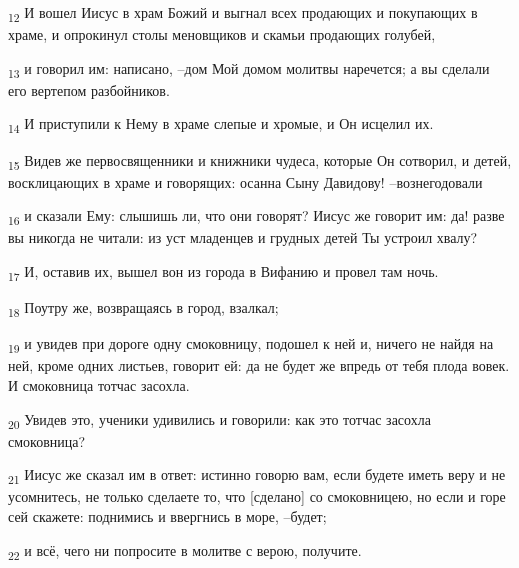 \begin{tcolorbox}
\textsubscript{12} И вошел Иисус в храм Божий и выгнал всех продающих и покупающих в храме, и опрокинул столы меновщиков и скамьи продающих голубей,
\end{tcolorbox}
\begin{tcolorbox}
\textsubscript{13} и говорил им: написано, --дом Мой домом молитвы наречется; а вы сделали его вертепом разбойников.
\end{tcolorbox}
\begin{tcolorbox}
\textsubscript{14} И приступили к Нему в храме слепые и хромые, и Он исцелил их.
\end{tcolorbox}
\begin{tcolorbox}
\textsubscript{15} Видев же первосвященники и книжники чудеса, которые Он сотворил, и детей, восклицающих в храме и говорящих: осанна Сыну Давидову! --вознегодовали
\end{tcolorbox}
\begin{tcolorbox}
\textsubscript{16} и сказали Ему: слышишь ли, что они говорят? Иисус же говорит им: да! разве вы никогда не читали: из уст младенцев и грудных детей Ты устроил хвалу?
\end{tcolorbox}
\begin{tcolorbox}
\textsubscript{17} И, оставив их, вышел вон из города в Вифанию и провел там ночь.
\end{tcolorbox}
\begin{tcolorbox}
\textsubscript{18} Поутру же, возвращаясь в город, взалкал;
\end{tcolorbox}
\begin{tcolorbox}
\textsubscript{19} и увидев при дороге одну смоковницу, подошел к ней и, ничего не найдя на ней, кроме одних листьев, говорит ей: да не будет же впредь от тебя плода вовек. И смоковница тотчас засохла.
\end{tcolorbox}
\begin{tcolorbox}
\textsubscript{20} Увидев это, ученики удивились и говорили: как это тотчас засохла смоковница?
\end{tcolorbox}
\begin{tcolorbox}
\textsubscript{21} Иисус же сказал им в ответ: истинно говорю вам, если будете иметь веру и не усомнитесь, не только сделаете то, что [сделано] со смоковницею, но если и горе сей скажете: поднимись и ввергнись в море, --будет;
\end{tcolorbox}
\begin{tcolorbox}
\textsubscript{22} и всё, чего ни попросите в молитве с верою, получите.
\end{tcolorbox}
